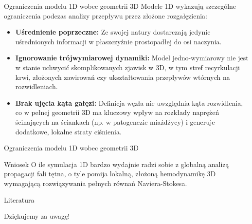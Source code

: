 \documentclass[aspectratio=169]{beamer}
\begin{document}
\begin{frame}{Ograniczenia modelu 1D wobec geometrii 3D}
    Modele 1D wykazują szczególne ograniczenia podczas analizy przepływu przez złożone rozgałęzienia:
    \vspace{0.3cm}
    \begin{itemize}
        \item \textbf{Uśrednienie poprzeczne:} Ze swojej natury dostarczają jedynie uśrednionych informacji w płaszczyźnie prostopadłej do osi naczynia.
        \item \textbf{Ignorowanie trójwymiarowej dynamiki:} Model jedno-wymiarowy nie jest w stanie uchwycić skomplikowanych zjawisk w 3D, w tym stref recyrkulacji krwi, złożonych zawirowań czy ukształtowania przepływów wtórnych na rozwidleniach.
        \item \textbf{Brak ujęcia kąta gałęzi:} Definicja węzła nie uwzględnia kąta rozwidlenia, co w pełnej geometrii 3D ma kluczowy wpływ na rozkłady naprężeń ścinających na ściankach (np. w patogenezie miażdżycy) i generuje dodatkowe, lokalne straty ciśnienia.
    \end{itemize}
\end{frame}
\begin{frame}{Ograniczenia modelu 1D wobec geometrii 3D}
    \begin{block}{Wniosek}
        O ile symulacja 1D bardzo wydajnie radzi sobie z globalną analizą propagacji fali tętna, o tyle pomija lokalną, złożoną hemodynamikę 3D wymagającą rozwiązywania pełnych równań Naviera-Stokesa.
    \end{block}
\end{frame}

\begin{frame}{Literatura}
    \nocite{*}
    
    
    \vspace{1em}
    \centering
\end{frame}

\begin{frame}[standout]
    Dziękujemy za uwagę!
\end{frame}
\end{document}
